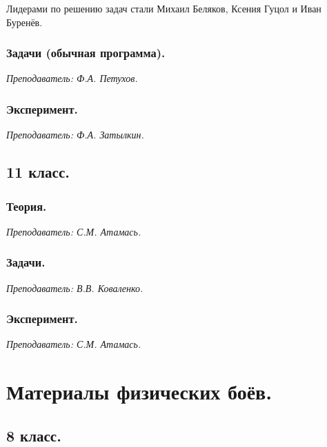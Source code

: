 \documentclass[12pt]{article}
\newlength{\h}
\newlength{\x}
\begin{document}
Лидерами по решению задач стали Михаил Беляков, Ксения Гуцол и Иван Буренёв.

\subsubsection{Задачи (обычная программа).}
\label{sec:daily10pr-norm}

\textit{Преподаватель: Ф.А. Петухов.}

\subsubsection{Эксперимент.}
\label{sec:daily10exp}

\textit{Преподаватель: Ф.А. Затылкин.}\\

\subsection{11 класс.}
\label{sec:daily11}

\subsubsection{Теория.}
\label{sec:daily11th}

\textit{Преподаватель: С.М. Атамась.}\\

\subsubsection{Задачи.}
\label{sec:daily11pr}

\textit{Преподаватель: В.В. Коваленко.}\\

\subsubsection{Эксперимент.}
\label{sec:daily11exp}

\textit{Преподаватель: С.М. Атамась.}\\

\clearpage

\section{Материалы физических боёв. }
\label{sec:battles}

\subsection{8 класс.}
\label{sec:battle8}
\end{document}
